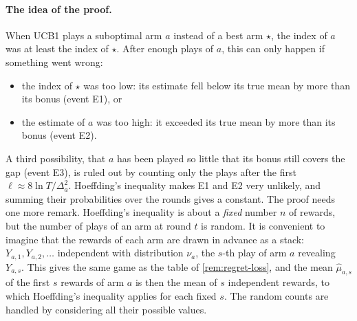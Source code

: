 \paragraph{The idea of the proof.} When UCB1 plays a suboptimal arm $a$
instead of a best arm $\star$, the index of $a$ was at least the index of
$\star$. After enough plays of $a$, this can only happen if something went
wrong:
\begin{itemize}[nosep]
  \item the index of $\star$ was too low: its estimate fell below its true
    mean by more than its bonus (event E1), or
  \item the estimate of $a$ was too high: it exceeded its true mean by more
    than its bonus (event E2).
\end{itemize}
A third possibility, that $a$ has been played so little that its bonus
still covers the gap (event E3), is ruled out by counting only the plays
after the first $\ell \approx 8 \ln T / \Delta_a^2$. Hoeffding's inequality
makes E1 and E2 very unlikely, and summing their probabilities over the
rounds gives a constant. The proof needs one more remark. Hoeffding's
inequality is about a \emph{fixed} number $n$ of rewards, but the number of
plays of an arm at round $t$ is random. It is convenient to imagine that
the rewards of each arm are drawn in advance as a stack: $Y_{a, 1}, Y_{a,
2}, \dots$ independent with distribution $\nu_a$, the $s$-th play of arm $a$
revealing $Y_{a, s}$. This gives the same game as the table of
\cref{rem:regret-loss}, and the mean $\hat\mu_{a, s}$ of the first $s$
rewards of arm $a$ is then the mean of $s$ independent rewards, to which
Hoeffding's inequality applies for each fixed $s$. The random counts are
handled by considering all their possible values.

